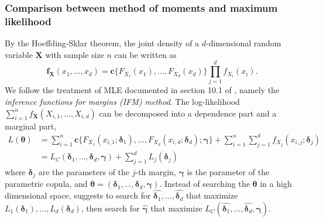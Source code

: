 \subsubsection{Comparison between method of moments and maximum likelihood}
\label{subsec:maximum-likelihood-estimation}
By the Hoeffding-Sklar theorem, the joint density of a $d$-dimensional random variable $\bm{X}$ with sample size $n$ can be written as
\begin{equation*}
    \bm{f}_{\bm{X}}(x_1, ..., x_d) = \bm{c}\{F_{X_1}(x_1), ..., F_{X_d}(x_d)\} \prod_{j=1}^d f_{X_i}(x_i).
    \end{equation*}
We follow the treatment of MLE documented in section 10.1 of
\citet{joe1997multivariate}, namely the {\em inference functions for
margins (IFM) method}.
The log-likelihood $\sum^n_{i=1}f_{\bm{X}}(X_{i,1}, ..., X_{i,d})$ can be decomposed into a dependence part and a marginal part,
\begin{align}
    L(\bm{\theta}) &= \sum_{i=1}^n \bm{c}\{F_{X_1}(x_{i,1};\bm{\delta}_1), ..., F_{X_d}(x_{i,d}; \bm{\delta}_d);\bm{\gamma}\}
    + \sum_{i=1}^n \sum_{j=1}^d f_{X_j}(x_{i,j};\bm{\delta}_j)\\
    &= L_C(\bm{\delta}_1, ..., \bm{\delta}_d, \bm{\gamma}) + \sum_{j=1}^d L_j(\bm{\delta}_j)
    \end{align}
where $\bm{\delta}_j$ are the parameters of the $j$-th margin, $\bm{\gamma}$ is the parameter of the parametric copula, and
$\bm{\theta} = (\bm{\delta}_1,..., \bm{\delta}_d, \bm{\gamma})$.
Instead of searching the $\bm{\theta}$ in a high dimensional space, \citet{joe1997multivariate} suggests to
search for $\hat{\bm{\delta}_1},..., \hat{\bm{\delta}_d}$ that maximize $L_1(\bm{\delta}_1), ..., L_d(\bm{\delta}_d)$,
then search for $\hat{\bm{\gamma}}$ that maximize $L_C(\hat{\bm{\delta}_1},..., \hat{\bm{\delta}_d}, \bm{\gamma})$.



